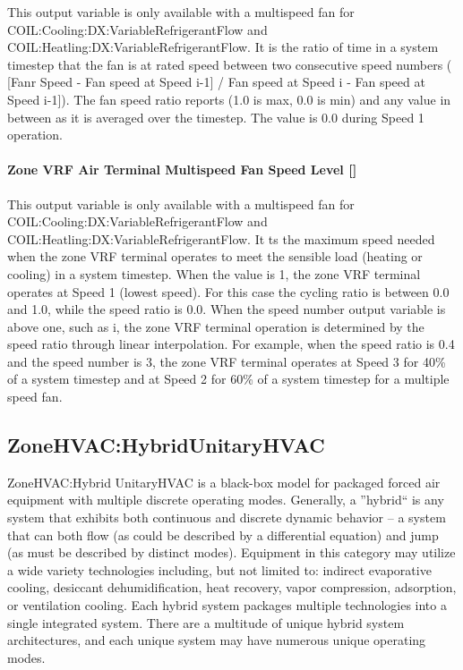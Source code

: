 This output variable is only available with a multispeed fan  for COIL:Cooling:DX:VariableRefrigerantFlow and COIL:Heatling:DX:VariableRefrigerantFlow. It is the ratio of time in a system timestep that the fan is at rated speed between two consecutive speed numbers ( [Fanr Speed - Fan speed at Speed i-1] / Fan speed at Speed i - Fan speed at Speed i-1]). The fan speed ratio reports (1.0 is max, 0.0 is min) and any value in between as it is averaged over the timestep. The value is 0.0 during Speed 1 operation.

\paragraph{Zone VRF Air Terminal Multispeed Fan Speed Level {[]}}\label{zone-vrf-air-terminal-multispeed-fan-speed-level}

This output variable is only available with a multispeed fan  for COIL:Cooling:DX:VariableRefrigerantFlow and COIL:Heatling:DX:VariableRefrigerantFlow. It ts the maximum speed needed when the zone VRF terminal operates to meet the sensible load (heating or cooling) in a system timestep. When the value is 1, the zone VRF terminal operates at Speed 1 (lowest speed). For this case the cycling ratio is between 0.0 and 1.0, while the speed ratio is 0.0. When the speed number output variable is above one, such as i, the zone VRF terminal operation is determined by the speed ratio through linear interpolation. For example, when the speed ratio is 0.4 and the speed number is 3, the zone VRF terminal operates at Speed 3 for 40\% of a system timestep and at Speed 2 for 60\% of a system timestep for a multiple speed fan.

\subsection{ZoneHVAC:HybridUnitaryHVAC}\label{zonehvac-hybridunitaryhvac}

ZoneHVAC:Hybrid UnitaryHVAC is a black-box model for packaged forced air equipment with multiple discrete operating modes. Generally, a ''hybrid`` is any system that exhibits both continuous and discrete dynamic behavior – a system that can both flow (as could be described by a differential equation) and jump (as must be described by distinct modes). Equipment in this category may utilize a wide variety technologies including, but not limited to: indirect evaporative cooling, desiccant dehumidification, heat recovery, vapor compression, adsorption, or ventilation cooling. Each hybrid system packages multiple technologies into a single integrated system. There are a multitude of unique hybrid system architectures, and each unique system may have numerous unique operating modes.

